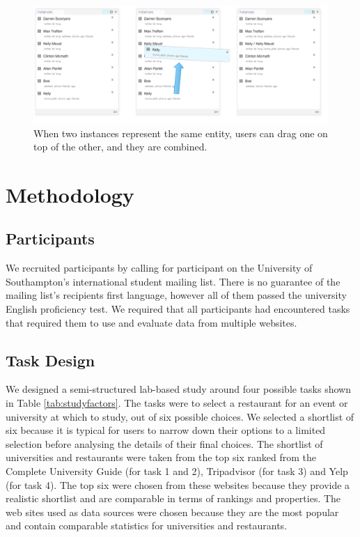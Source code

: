 \documentclass{sigchi}
\begin{document}
\begin{figure}[htbp]
\begin{center}
\includegraphics[width=18cm]{img/sameas}
\caption{When two instances represent the same entity, users can drag one on top of the other, and they are combined.}
\label{fig:sameas}
\end{center}
\end{figure}


\section{Methodology}

\subsection{Participants}
We recruited participants by calling for participant on the University of Southampton's international student mailing list.  There is no guarantee of the mailing list's recipients first language, however all of them passed the university English proficiency test.  We required that all participants had encountered tasks that required them to use and evaluate data from multiple websites.

\subsection{Task Design}
We designed a semi-structured lab-based study around four possible tasks shown in Table \ref{tab:studyfactors}.  The tasks were to select a restaurant for an event or university at which to study, out of six possible choices. We selected a shortlist of six because it is typical for users to narrow down their options to a limited selection before analysing the details of their final choices. The shortlist of universities and restaurants were taken from the top six ranked from the Complete University Guide (for task 1 and 2), Tripadvisor (for task 3) and Yelp (for task 4).  The top six were chosen from these websites because they provide a realistic shortlist and are comparable in terms of rankings and properties. The web sites used as data sources were chosen because they are the most popular and contain comparable statistics for universities and restaurants.
\end{document}
